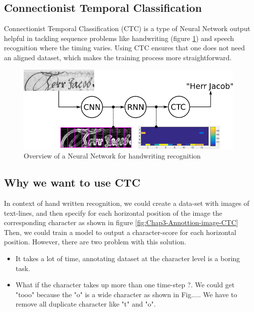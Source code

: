       \subsection{ Connectionist Temporal Classification }
      Connectionist Temporal Classification (CTC) is a type of Neural Network output helpful
      in tackling sequence problems like handwriting (figure \ref{fig:Chap3-Overview-CTC}) and speech recognition where the timing varies.
      Using CTC ensures that one does not need an aligned dataset, which makes the training process
      more straightforward.
      \begin{figure}[H]
        \centering
        \includegraphics[width=\textwidth]{img/Chap3/Overview-CTC}
        \caption{ Overview of a Neural Network for handwriting recognition }
        \label{fig:Chap3-Overview-CTC}
      \end{figure}

      \subsection{ Why we want to use CTC }
        In context of hand written recognition, we could create a data-set with
        images of text-lines, and then specify for each horizontal position of the image
        the corresponding character as shown in figure \ref{fig:Chap3-Annottion-image-CTC} Then, we could train a model to output
        a character-score for each horizontal position. However, there are two problem with this
        solution.
        \begin{itemize}
          \item It takes a lot of time, annotating dataset at the character level is a boring task.
          \item What if the character takes up more than one time-step ?. We could get "tooo" because
          the "o" is a wide character as shown in Fig..... We have to remove all duplicate character
          like "t" and "o".
        \end{itemize}

